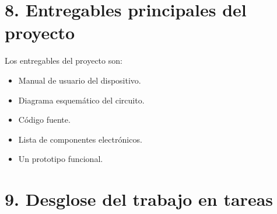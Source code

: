 \documentclass[
11pt, %
codirector, %
]{charter}
\begin{document}
\section{8. Entregables principales del proyecto}
\label{sec:entregables}

Los entregables del proyecto son:
\begin{itemize}
	\item Manual de usuario del dispositivo.
	\item Diagrama esquemático del circuito.
	\item Código fuente.
	\item Lista de componentes electrónicos.
	\item Un prototipo funcional.
\end{itemize}



\section{9. Desglose del trabajo en tareas}
\label{sec:wbs}
\end{document}
